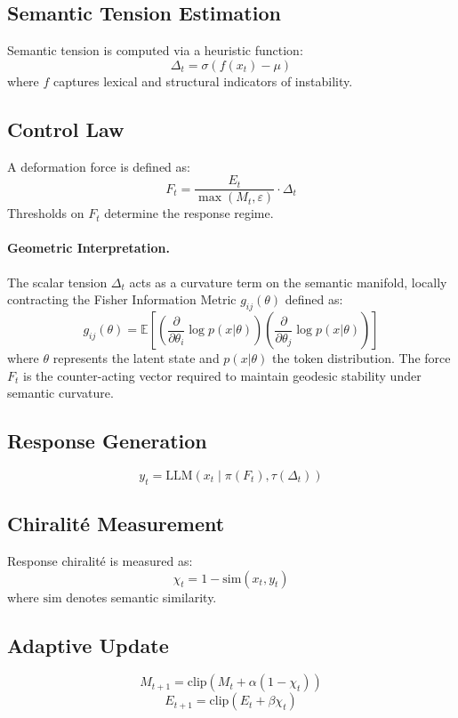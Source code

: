 \documentclass[11pt]{article}
\begin{document}
\subsection{Semantic Tension Estimation}
Semantic tension is computed via a heuristic function:
\[
\Delta_t = \sigma(f(x_t) - \mu)
\]
where $f$ captures lexical and structural indicators of instability.

\subsection{Control Law}
A deformation force is defined as:
\[
F_t = \frac{E_t}{\max(M_t, \varepsilon)} \cdot \Delta_t
\]
Thresholds on $F_t$ determine the response regime.

\paragraph{Geometric Interpretation.} The scalar tension $\Delta_t$ acts as a curvature term on the semantic manifold, locally contracting the Fisher Information Metric $g_{ij}(\theta)$ defined as:
\[
g_{ij}(\theta) = \mathbb{E}\left[\left(\frac{\partial}{\partial\theta_i}\log p(x|\theta)\right)\left(\frac{\partial}{\partial\theta_j}\log p(x|\theta)\right)\right]
\]
where $\theta$ represents the latent state and $p(x|\theta)$ the token distribution. The force $F_t$ is the counter-acting vector required to maintain geodesic stability under semantic curvature.

\subsection{Response Generation}
\[
y_t = \text{LLM}(x_t \mid \pi(F_t), \tau(\Delta_t))
\]

\subsection{Chiralit\'e Measurement}
Response chiralit\'e is measured as:
\[
\chi_t = 1 - \text{sim}(x_t, y_t)
\]
where $\text{sim}$ denotes semantic similarity.

\subsection{Adaptive Update}
\[
M_{t+1} = \text{clip}(M_t + \alpha (1 - \chi_t))
\]
\[
E_{t+1} = \text{clip}(E_t + \beta \chi_t)
\]
\end{document}
